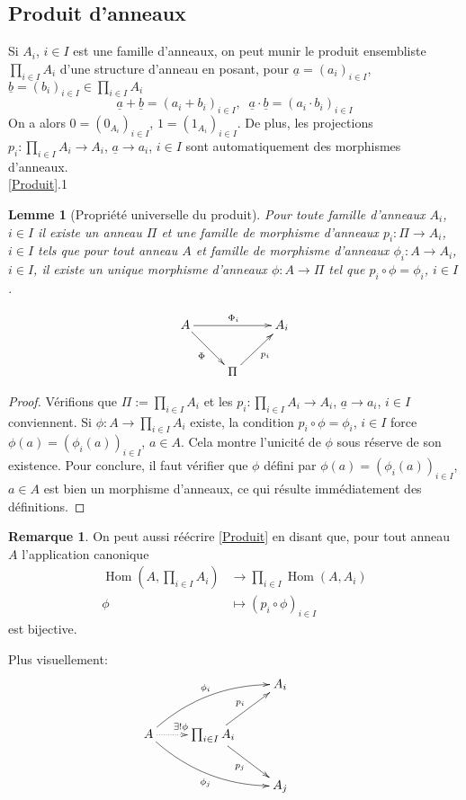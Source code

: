 \documentclass[a4paper, oneside, 12pt]{book}
\theoremstyle{theoremeStyle} %
\newtheorem{lemme}[theoreme]{Lemme}
\theoremstyle{definition} %
\newtheorem{remarque}[theoreme]{Remarque}
\DeclareMathOperator{\SHom}{Hom}
\begin{document}
	\subsection{Produit d'anneaux}
		\label{Produit (Anneaux)}\label{Produit} Si $A_i$, $i\in I$ est une famille d'anneaux, on peut munir le produit ensembliste $\prod_{i\in I}A_i$ d'une structure d'anneau en posant, pour $\underline{a}=(a_i)_{i\in I}$, $\underline{b}=(b_i)_{i\in I}\in \prod_{i\in I}A_i$
$$\underline{a}+\underline{b}=(a_i+b_i)_{i\in I},\;\; \underline{a}\cdot \underline{b}=(a_i\cdot b_i)_{i\in I}$$
On a alors $0 =(0_{A_i})_{i\in I}$, $1 =(1_{A_i})_{i\in I}$. De plus, les projections $p_i:\prod_{i\in I}A_i\rightarrow A_i$, $\underline{a}\rightarrow a_i$, $i\in I$ sont automatiquement des morphismes d'anneaux. \\

		\ref{Produit}.1 \begin{lemme}[Propriété universelle du produit]Pour toute famille d'anneaux $A_i$, $i\in I$ il existe un anneau $\Pi$ et une famille de morphisme d'anneaux $p_i:\Pi\rightarrow A_i$, $i\in I$ tels que pour tout anneau $A$ et famille de morphisme d'anneaux $\phi_i:A\rightarrow A_i$, $i\in I$, il existe un unique morphisme d'anneaux $\phi:A\rightarrow \Pi$ tel que $p_i\circ \phi=\phi_i$, $i\in I$.\end{lemme}

	$$ \xymatrix{ A \ar[rr]^{\Phi_i} \ar[rd]_\Phi && A_i \\ & \Pi  \ar[ru]_{p_i}} $$

\begin{proof} Vérifions que $\Pi:= \prod_{i\in I}A_i$ et les $p_i:\prod_{i\in I}A_i\rightarrow A_i$, $\underline{a}\rightarrow a_i$, $i\in I$ conviennent. Si $\phi:A\rightarrow \prod_{i\in I}A_i$ existe, la condition $p_i\circ \phi =\phi_i$, $i\in I$ force
$\phi(a)=(\phi_i(a))_{i\in I}$, $a\in A$. Cela montre l'unicité de $\phi$  sous réserve de son existence. Pour conclure, il faut vérifier que $\phi$ défini par  $\phi(a)=(\phi_i(a))_{i\in I}$, $a\in A$ est bien un morphisme d'anneaux, ce qui résulte immédiatement des définitions.
\end{proof}

\begin{remarque}On peut aussi réécrire \ref{Produit} en disant que, pour tout anneau $A$  l'application  canonique
	\begin{align*}\SHom(A,\prod_{i\in I}A_{i}) &\to \prod_{i\in I}\SHom (A,A_{i}) \\ \phi &\mapsto (p_i\circ \phi)_{i\in I}\end{align*}
est bijective.\end{remarque}
		Plus visuellement:
$$\xymatrix{&&A_i \\
A\ar@{.>}[r]^{\exists ! \phi}\ar@/^1pc/[urr]^{\phi_i}\ar@/_1pc/[drr]_{\phi_j}&\prod_{i\in I}A_i\ar[ur]^{p_i}\ar[dr]_{p_j}\\
&&A_j& }$$
\end{document}
